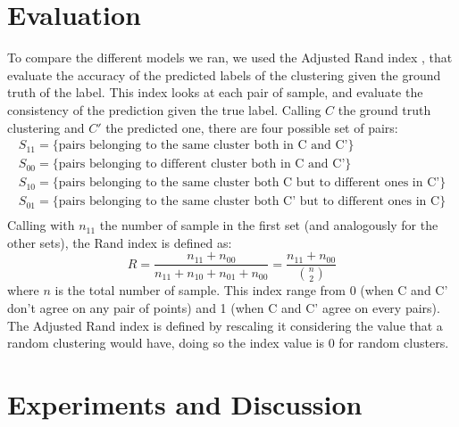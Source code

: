 \documentclass[]{article}
\begin{document}
	\section{Evaluation}
	To compare the different models we ran, we used the Adjusted Rand index \cite{rand},  that evaluate the accuracy of the predicted labels of the clustering given the ground truth of the label. 
	This index looks at each pair of sample, and evaluate the consistency of the prediction given the true label. Calling $C$ the ground truth clustering and $C'$ the predicted one, there are four possible set of pairs:
	$$
	\begin{array}{ll}
	S_{11} = \{\text{pairs belonging to the same cluster both in C and C'} \}\\
	S_{00} =  \{\text{pairs belonging to different cluster both in C and C'} \}\\
	S_{10} =  \{\text{pairs belonging to the same cluster both C but to different ones in C'} \}\\
	S_{01} =  \{\text{pairs belonging to the same cluster both C' but to different ones in C} \}\\
	\end{array}
	$$
	Calling with $n_{11}$ the number of sample in the first set (and analogously for the other sets), the Rand index is defined as:
	$$
	R=\frac{n_{11}+n_{00}}{n_{11}+n_{10}+n_{01}+n_{00}} = \frac{n_{11}+n_{00}}{{ n\choose 2}}
	$$
	where $n$ is the total number of sample. This index range from 0 (when C and C' don't agree on any pair of points) and 1 (when C and C' agree on every pairs). The Adjusted Rand index is defined by rescaling it considering the value that a random clustering would have, doing so the index value is 0 for random clusters. 
	
	\section{Experiments and Discussion}

\end{document}
